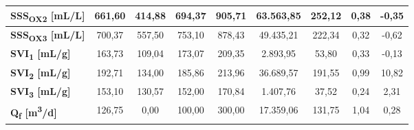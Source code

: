 \begin{sidewaystable}[h]
\begin{center}
\begin{tabular}{lcccccccc}
		\multicolumn{1}{|l|}{\textbf{SSS\textsubscript{OX2} {[}mL/L{]}}}        & \multicolumn{1}{c|}{661,60}         & \multicolumn{1}{c|}{414,88}                  & \multicolumn{1}{c|}{694,37}           & \multicolumn{1}{c|}{905,71}                  & \multicolumn{1}{c|}{63.563,85}         & \multicolumn{1}{c|}{252,12}            & \multicolumn{1}{c|}{0,38}        & \multicolumn{1}{c|}{-0,35}          \\ \hline
		\multicolumn{1}{|l|}{\textbf{SSS\textsubscript{OX3} {[}mL/L{]}}}        & \multicolumn{1}{c|}{700,37}         & \multicolumn{1}{c|}{557,50}                  & \multicolumn{1}{c|}{753,10}           & \multicolumn{1}{c|}{878,43}                  & \multicolumn{1}{c|}{49.435,21}         & \multicolumn{1}{c|}{222,34}            & \multicolumn{1}{c|}{0,32}        & \multicolumn{1}{c|}{-0,62}          \\ \hline
		\multicolumn{1}{|l|}{\textbf{SVI\textsubscript{1} {[}mL/g{]}}}          & \multicolumn{1}{c|}{163,73}         & \multicolumn{1}{c|}{109,04}                  & \multicolumn{1}{c|}{173,07}           & \multicolumn{1}{c|}{209,35}                  & \multicolumn{1}{c|}{2.893,95}          & \multicolumn{1}{c|}{53,80}             & \multicolumn{1}{c|}{0,33}        & \multicolumn{1}{c|}{-0,13}          \\ \hline
		\multicolumn{1}{|l|}{\textbf{SVI\textsubscript{2} {[}mL/g{]}}}          & \multicolumn{1}{c|}{192,71}         & \multicolumn{1}{c|}{134,00}                  & \multicolumn{1}{c|}{185,86}           & \multicolumn{1}{c|}{213,96}                  & \multicolumn{1}{c|}{36.689,57}         & \multicolumn{1}{c|}{191,55}            & \multicolumn{1}{c|}{0,99}        & \multicolumn{1}{c|}{10,82}          \\ \hline
		\multicolumn{1}{|l|}{\textbf{SVI\textsubscript{3} {[}mL/g{]}}}          & \multicolumn{1}{c|}{153,10}         & \multicolumn{1}{c|}{130,57}                  & \multicolumn{1}{c|}{152,00}           & \multicolumn{1}{c|}{170,84}                  & \multicolumn{1}{c|}{1.407,76}          & \multicolumn{1}{c|}{37,52}             & \multicolumn{1}{c|}{0,24}        & \multicolumn{1}{c|}{2,31}           \\ \hline
		\multicolumn{1}{|l|}{\textbf{Q\textsubscript{f}  {[}m\textsuperscript{3}/d{]}}}           & \multicolumn{1}{c|}{126,75}         & \multicolumn{1}{c|}{0,00}                  & \multicolumn{1}{c|}{100,00}           & \multicolumn{1}{c|}{300,00}                  & \multicolumn{1}{c|}{17.359,06}          & \multicolumn{1}{c|}{131,75}             & \multicolumn{1}{c|}{1,04}        & \multicolumn{1}{c|}{0,28}          \\ \hline

\end{tabular}
\end{center}
\end{sidewaystable}
